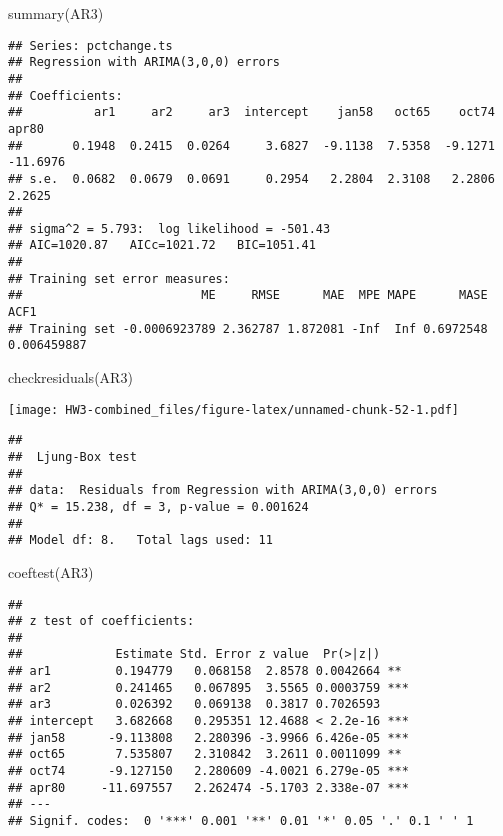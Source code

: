 \documentclass[
]{article}
\newenvironment{Shaded}{\begin{snugshade}}{\end{snugshade}}
\newcommand{\FunctionTok}[1]{\textcolor[rgb]{0.00,0.00,0.00}{#1}}
\newcommand{\NormalTok}[1]{#1}
\begin{document}
\begin{Shaded}
\begin{Highlighting}[]
\FunctionTok{summary}\NormalTok{(AR3)}
\end{Highlighting}
\end{Shaded}

\begin{verbatim}
## Series: pctchange.ts 
## Regression with ARIMA(3,0,0) errors 
## 
## Coefficients:
##          ar1     ar2     ar3  intercept    jan58   oct65    oct74     apr80
##       0.1948  0.2415  0.0264     3.6827  -9.1138  7.5358  -9.1271  -11.6976
## s.e.  0.0682  0.0679  0.0691     0.2954   2.2804  2.3108   2.2806    2.2625
## 
## sigma^2 = 5.793:  log likelihood = -501.43
## AIC=1020.87   AICc=1021.72   BIC=1051.41
## 
## Training set error measures:
##                         ME     RMSE      MAE  MPE MAPE      MASE        ACF1
## Training set -0.0006923789 2.362787 1.872081 -Inf  Inf 0.6972548 0.006459887
\end{verbatim}

\begin{Shaded}
\begin{Highlighting}[]
\FunctionTok{checkresiduals}\NormalTok{(AR3)}
\end{Highlighting}
\end{Shaded}

\texttt{[image: HW3-combined\_files/figure-latex/unnamed-chunk-52-1.pdf]}

\begin{verbatim}
## 
##  Ljung-Box test
## 
## data:  Residuals from Regression with ARIMA(3,0,0) errors
## Q* = 15.238, df = 3, p-value = 0.001624
## 
## Model df: 8.   Total lags used: 11
\end{verbatim}

\begin{Shaded}
\begin{Highlighting}[]
\FunctionTok{coeftest}\NormalTok{(AR3)}
\end{Highlighting}
\end{Shaded}

\begin{verbatim}
## 
## z test of coefficients:
## 
##             Estimate Std. Error z value  Pr(>|z|)    
## ar1         0.194779   0.068158  2.8578 0.0042664 ** 
## ar2         0.241465   0.067895  3.5565 0.0003759 ***
## ar3         0.026392   0.069138  0.3817 0.7026593    
## intercept   3.682668   0.295351 12.4688 < 2.2e-16 ***
## jan58      -9.113808   2.280396 -3.9966 6.426e-05 ***
## oct65       7.535807   2.310842  3.2611 0.0011099 ** 
## oct74      -9.127150   2.280609 -4.0021 6.279e-05 ***
## apr80     -11.697557   2.262474 -5.1703 2.338e-07 ***
## ---
## Signif. codes:  0 '***' 0.001 '**' 0.01 '*' 0.05 '.' 0.1 ' ' 1
\end{verbatim}
\end{document}
